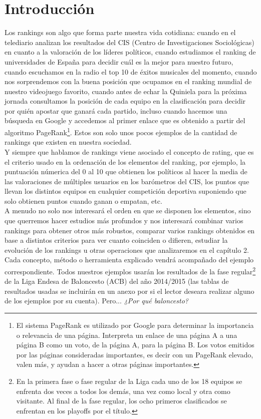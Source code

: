 \chapter{Introducción}
Los rankings son algo que forma parte nuestra vida cotidiana: cuando en el telediario analizan los resultados del CIS (Centro de Investigaciones Sociológicas) en cuanto a la valoración de los líderes políticos, cuando estudiamos el ranking de universidades de España para decidir cuál es la mejor para nuestro futuro, cuando escuchamos en la radio el top 10 de éxitos musicales del momento, cuando nos sorprendemos con la buena posición que ocupamos en el ranking mundial de nuestro videojuego favorito, cuando antes de echar la Quiniela para la próxima jornada consultamos la posición de cada equipo en la clasificación para decidir por quién apostar que ganará cada partido, incluso cuando hacemos una búsqueda en Google y accedemos al primer enlace que es obtenido a partir del algoritmo PageRank\footnote{El sistema PageRank es utilizado por Google para determinar la importancia o relevancia de una página. Interpreta un enlace de una página A a una página B como un voto, de la página A, para la página B. Los votos emitidos por las páginas consideradas importantes, es decir con un PageRank elevado, valen más, y ayudan a hacer a otras páginas importantes.}. Estos son solo unos pocos ejemplos de la cantidad de rankings que existen en nuestra sociedad.\\

Y siempre que hablamos de rankings viene asociado el concepto de rating, que es el criterio usado en la ordenación de los elementos del ranking, por ejemplo, la puntuación númerica del 0 al 10 que obtienen los políticos al hacer la media de las valoraciones de múltiples usuarios en los barómetros del CIS, los puntos que llevan los distintos equipos en cualquier competición deportiva suponiendo que solo obtienen puntos cuando ganan o empatan, etc.\\

A menudo no solo nos interesará el orden en que se disponen los elementos, sino que querremos hacer estudios más profundos y nos interesará combinar varios rankings para obtener otros más robustos, comparar varios rankings obtenidos en base a distintos criterios para ver cuanto coinciden o difieren, estudiar la evolución de los rankings u otras operaciones que analizaremos en el capítulo 2.\\

Cada concepto, método o herramienta explicado vendrá acompañado del ejemplo correspondiente. Todos nuestros ejemplos usarán los resultados de la fase regular\footnote{En la primera fase o fase regular de la Liga cada uno de los 18 equipos se enfrenta dos veces a todos los demás, una vez como local y otra como visitante. Al final de la fase regular, los ocho primeros clasificados se enfrentan en los playoffs por el título.} de la Liga Endesa de Baloncesto (ACB) del año 2014/2015 (las tablas de resultados usadas se incluirán en un anexo por si el lector deseara realizar alguno de los ejemplos por su cuenta). Pero... \textit{¿Por qué baloncesto?}

